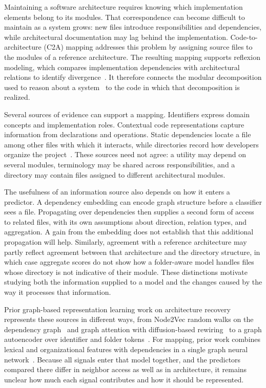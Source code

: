 Maintaining a software architecture requires knowing which implementation elements belong to its modules. That correspondence can become difficult to maintain as a system grows: new files introduce responsibilities and dependencies, while architectural documentation may lag behind the implementation. Code-to-architecture (C2A) mapping addresses this problem by assigning source files to the modules of a reference architecture. The resulting mapping supports reflexion modeling, which compares implementation dependencies with architectural relations to identify divergence~\cite{reflexion1}. It therefore connects the modular decomposition used to reason about a system~\cite{parnas1972,clements2003} to the code in which that decomposition is realized.

Several sources of evidence can support a mapping. Identifiers express domain concepts and implementation roles. Contextual code representations capture information from declarations and operations. Static dependencies locate a file among other files with which it interacts, while directories record how developers organize the project~\cite{sarif,negar,garcia2013}. These sources need not agree: a utility may depend on several modules, terminology may be shared across responsibilities, and a directory may contain files assigned to different architectural modules.

The usefulness of an information source also depends on how it enters a predictor. A dependency embedding can encode graph structure before a classifier sees a file. Propagating over dependencies then supplies a second form of access to related files, with its own assumptions about direction, relation types, and aggregation. A gain from the embedding does not establish that this additional propagation will help. Similarly, agreement with a reference architecture may partly reflect agreement between that architecture and the directory structure, in which case aggregate scores do not show how a folder-aware model handles files whose directory is not indicative of their module. These distinctions motivate studying both the information supplied to a model and the changes caused by the way it processes that information.

Prior graph-based representation learning work on architecture recovery represents these sources in different ways, from Node2Vec random walks on the dependency graph~\cite{negar} and graph attention with diffusion-based rewiring~\cite{structsar} to a graph autoencoder over identifier and folder tokens~\cite{gaer}. For mapping, prior work combines lexical and organizational features with dependencies in a single graph neural network~\cite{jabeen2025graph,c2a_mapping}. Because all signals enter that model together, and the predictors compared there differ in neighbor access as well as in architecture, it remains unclear how much each signal contributes and how it should be represented.

